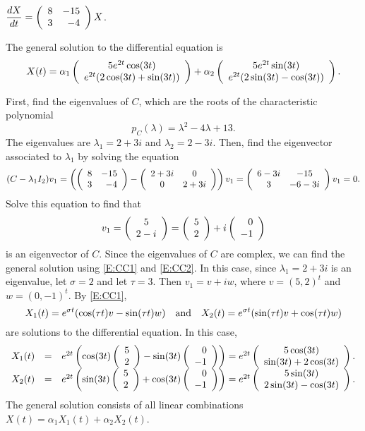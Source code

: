 \documentclass{ximera}
\begin{document}
\begin{exercise}  \label{c6.6.2b}
$\displaystyle\frac{dX}{dt} = \left(\begin{array}{rr} 8 & -15\\ 3 &-4\end{array}\right) X$.

\begin{solution}

\ans The general solution to the differential equation is
\[
X(t) =
\alpha_1\left(\begin{array}{c} 5e^{2t}\cos(3t) \\ e^{2t}(2\cos(3t) + \sin(3t))\end{array}\right) +
\alpha_2\left(\begin{array}{c} 5e^{2t}\sin(3t) \\ e^{2t}(2\sin(3t) - \cos(3t))\end{array}\right).
\]

\soln First, find the eigenvalues of $C$, which are the roots of the
characteristic polynomial
\[
p_C(\lambda) = \lambda^2 - 4\lambda + 13.
\]
The eigenvalues are $\lambda_1 = 2 + 3i$ and $\lambda_2 = 2 - 3i$.  Then,
find the eigenvector associated to $\lambda_1$ by solving the equation
\[
(C - \lambda_1I_2)v_1 =
\left(\left(\begin{array}{rr} 8 & -15\\ 3 &-4\end{array}\right) - \left(\begin{array}{cc} 2 + 3i & 0\\ 0 &2 + 3i\end{array}\right)\right)v_1
= \left(\begin{array}{cc} 6 - 3i & -15\\ 3 &-6 - 3i\end{array}\right)v_1 = 0.
\]
Solve this equation to find that
\[
v_1 = \left(\begin{array}{c} 5 \\ 2 - i\end{array}\right) = \left(\begin{array}{r} 5 \\ 2\end{array}\right) + i\left(\begin{array}{r} 0 \\ -1\end{array}\right)
\]
is an eigenvector of $C$.  Since the eigenvalues of $C$ are complex, we
can find the general solution using \eqref{E:CC1} and \eqref{E:CC2}.  In this
case, since $\lambda_1 = 2 + 3i$ is
an eigenvalue, let $\sigma = 2$ and let $\tau = 3$.  Then $v_1 = v + iw$,
where $v = (5,2)^t$ and $w = (0,-1)^t$.  By \eqref{E:CC1},
\[
X_1(t) = e^{\sigma t}(\cos(\tau t)v - \sin(\tau t)w) \quad\mbox{and}\quad
X_2(t) = e^{\sigma t}(\sin(\tau t)v + \cos(\tau t)w)
\]
are solutions to the differential equation.  In this case,
\[
\begin{array}{rcl}
X_1(t) & = & e^{2t}\left(\cos(3t)\left(\begin{array}{r} 5 \\ 2\end{array}\right) -
\sin(3t)\left(\begin{array}{r} 0 \\ -1\end{array}\right)\right)
= e^{2t}\left(\begin{array}{c} 5\cos(3t) \\ \sin(3t) + 2\cos(3t)\end{array}\right). \\
X_2(t) & = & e^{2t}\left(\sin(3t)\left(\begin{array}{r} 5 \\ 2\end{array}\right) +
\cos(3t)\left(\begin{array}{r} 0 \\ -1\end{array}\right)\right)
= e^{2t}\left(\begin{array}{c} 5\sin(3t) \\ 2\sin(3t) - \cos(3t)\end{array}\right).
\end{array}
\]
The general solution consists of all linear combinations
$X(t) = \alpha_1X_1(t) + \alpha_2X_2(t)$.


\end{solution}
\end{exercise}
\end{document}

